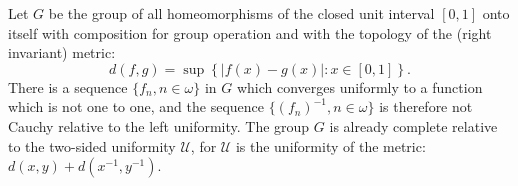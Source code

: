 Let $G$ be the group of all homeomorphisms of the closed unit interval $[0,1]$ onto itself with composition for group operation and with the topology of the (right invariant) metric: $$d(f, g) = \sup \left\{ |f(x) - g(x)| : x \in [0,1] \right\}.$$ There is a sequence $\{f_n, n \in \omega\}$ in $G$ which converges uniformly to a function which is not one to one, and the sequence $\{(f_n)^{-1}, n \in \omega\}$ is therefore not Cauchy relative to the left uniformity. The group $G$ is already complete relative to the two-sided uniformity $\mathcal{U}$, for $\mathcal{U}$ is the uniformity of the metric: $d(x, y) + d(x^{-1}, y^{-1})$.
